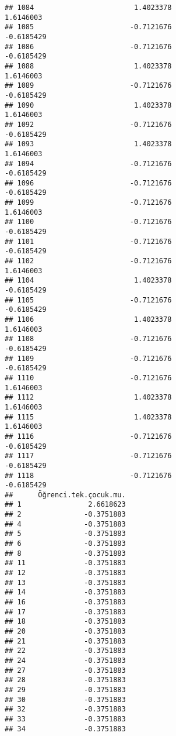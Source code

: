 \documentclass[
]{article}
\begin{document}
\begin{verbatim}
## 1084                        1.4023378                        1.6146003
## 1085                       -0.7121676                       -0.6185429
## 1086                       -0.7121676                       -0.6185429
## 1088                        1.4023378                        1.6146003
## 1089                       -0.7121676                       -0.6185429
## 1090                        1.4023378                        1.6146003
## 1092                       -0.7121676                       -0.6185429
## 1093                        1.4023378                        1.6146003
## 1094                       -0.7121676                       -0.6185429
## 1096                       -0.7121676                       -0.6185429
## 1099                       -0.7121676                        1.6146003
## 1100                       -0.7121676                       -0.6185429
## 1101                       -0.7121676                       -0.6185429
## 1102                       -0.7121676                        1.6146003
## 1104                        1.4023378                       -0.6185429
## 1105                       -0.7121676                       -0.6185429
## 1106                        1.4023378                        1.6146003
## 1108                       -0.7121676                       -0.6185429
## 1109                       -0.7121676                       -0.6185429
## 1110                       -0.7121676                        1.6146003
## 1112                        1.4023378                        1.6146003
## 1115                        1.4023378                        1.6146003
## 1116                       -0.7121676                       -0.6185429
## 1117                       -0.7121676                       -0.6185429
## 1118                       -0.7121676                       -0.6185429
##      Öğrenci.tek.çocuk.mu.
## 1                2.6618623
## 2               -0.3751883
## 4               -0.3751883
## 5               -0.3751883
## 6               -0.3751883
## 8               -0.3751883
## 11              -0.3751883
## 12              -0.3751883
## 13              -0.3751883
## 14              -0.3751883
## 16              -0.3751883
## 17              -0.3751883
## 18              -0.3751883
## 20              -0.3751883
## 21              -0.3751883
## 22              -0.3751883
## 24              -0.3751883
## 27              -0.3751883
## 28              -0.3751883
## 29              -0.3751883
## 30              -0.3751883
## 32              -0.3751883
## 33              -0.3751883
## 34              -0.3751883

\end{verbatim}
\end{document}
